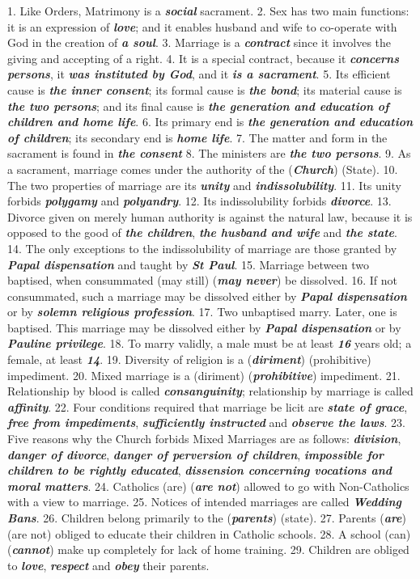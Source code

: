 \documentclass[a4paper,14pt]{memoir}
\newcommand\answer[1]{\textbf{\textit{#1}}}
\begin{document}
1. Like Orders, Matrimony is  a  \answer{social}  sacrament. 
2.  Sex  has  two  main
functions: it is an expression of \answer{love}; and it enables husband and  wife
to co-operate with God in the creation of \answer{a soul}.
3. Marriage is a  \answer{contract}
since it involves the giving and accepting of a right.
4. It  is  a  special
contract, because it \answer{concerns persons}, it \answer{was instituted by God}, and it  \answer{is a sacrament}. 
5.  Its
efficient  cause  is  \answer{the inner consent};  its  formal  cause  is  \answer{the bond};  its
material cause is \answer{the two persons}; and its final  cause  is  \answer{the generation and education of children and home life}. 
6.  Its
primary end is \answer{the generation and education of children}; its secondary end is \answer{home life}. 
7.  The  matter
and form in the  sacrament  is  found  in  \answer{the consent} 
8.  The  ministers  are
\answer{the two persons}.
9. As a sacrament, marriage comes  under  the  authority  of  the
(\answer{Church}) (State).
10. The two properties of marriage are its \answer{unity}  and
\answer{indissolubility}. 
11.  Its  unity  forbids  \answer{polygamy}  and  \answer{polyandry}.  
12.   Its
indissolubility forbids  \answer{divorce}. 
13.  Divorce  given  on  merely  human
authority is against the natural law, because it is opposed to the  good  of
\answer{the children},  \answer{the husband and wife}  and  \answer{the state}. 
14.  The  only  exceptions   to   the
indissolubility of marriage are those granted by  \answer{Papal dispensation}  and  taught  by
\answer{St Paul}.
15. Marriage between two baptised, when  consummated  (may  still)
(\answer{may never}) be dissolved.
16. If not consummated, such  a  marriage  may  be
dissolved either by \answer{Papal dispensation} or by \answer{solemn religious profession}. 
17.  Two  unbaptised  marry.
Later, one is baptised. This marriage may be dissolved either by  \answer{Papal dispensation}
or by \answer{Pauline privilege}.
18. To marry validly, a  male  must  be  at  least  \answer{16}
years old; a female, at least \answer{14}. 
19.  Diversity  of  religion  is  a
(\answer{diriment}) (prohibitive) impediment.
20.  Mixed  marriage  is  a  (diriment)
(\answer{prohibitive}) impediment.
21. Relationship  by  blood  is  called  \answer{consanguinity};
relationship by marriage is called \answer{affinity}.
22. Four  conditions  required
that marriage be licit are \answer{state of grace}, \answer{free from impediments},  \answer{sufficiently instructed}  and  \answer{observe the laws}.
23. Five reasons why the Church forbids  Mixed  Marriages  are  as  follows:
\answer{division}, \answer{danger of divorce}, \answer{danger of perversion of children}, \answer{impossible for children to be rightly educated}, \answer{dissension concerning vocations and moral matters}.
24. Catholics (are)  (\answer{are
not}) allowed to go with Non-Catholics with a view to marriage. 
25.  Notices
of intended marriages are called \answer{Wedding Bans}.
26. Children belong primarily  to
the (\answer{parents}) (state).
27. Parents (\answer{are}) (are not) obliged to educate  their
children  in  Catholic  schools. 
28.  A  school  (can)  (\answer{cannot})  make   up
completely  for  lack  of  home  training. 
29.  Children  are  obliged   to
\answer{love}, \answer{respect} and \answer{obey} their parents.
\end{document}
